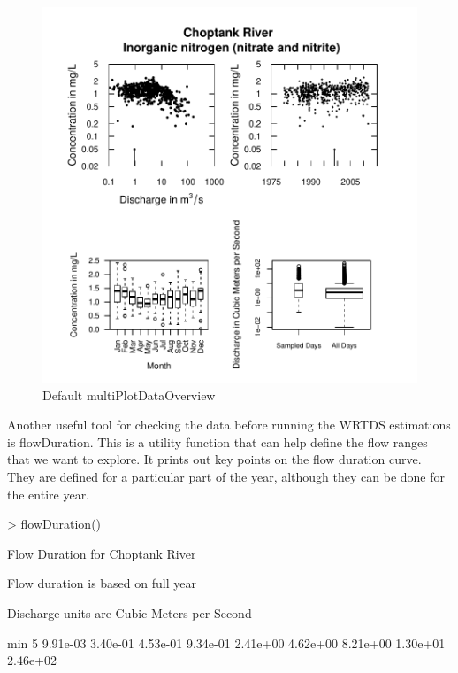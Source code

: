 \documentclass[a4paper,11pt]{article}
\begin{document}
\begin{figure}[ht]
\begin{center}

\includegraphics{EGRET-figmultiPlotDataOverview}
\end{center}
\caption{Default multiPlotDataOverview}
\label{fig:multiPlotDataOverview}
\end{figure}

\FloatBarrier

Another useful tool for checking the data before running the WRTDS estimations is flowDuration. This is a utility function that can help define the flow ranges that we want to explore.  It prints out key points on the flow duration curve.  They are defined for a particular part of the year, although they can be done for the entire year.  

\begin{Schunk}
\begin{Sinput}
> flowDuration()
\end{Sinput}
\begin{Soutput}
Flow Duration for Choptank River 

Flow duration is based on full year

Discharge units are Cubic Meters per Second

       min        5%
  9.91e-03  3.40e-01  4.53e-01  9.34e-01  2.41e+00  4.62e+00  8.21e+00  1.30e+01  2.46e+02 
\end{Soutput}
\end{Schunk}
\end{document}

